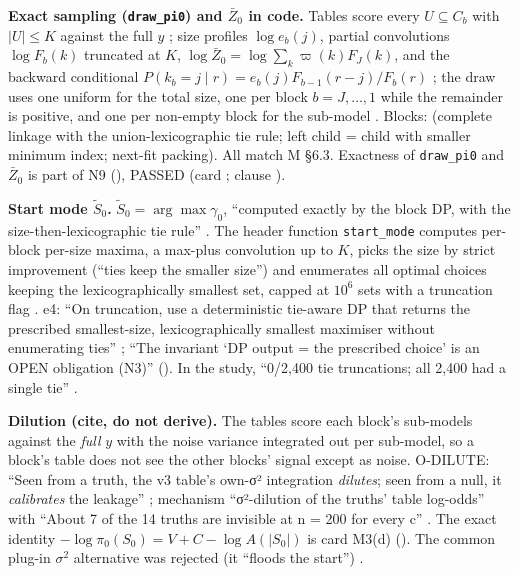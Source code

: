 \textbf{Exact sampling (\texttt{draw\_pi0}) and $\bar Z_0$ in code.} Tables score every $U\subseteq C_b$ with
$|U|\le K$ against the full $y$ ;
size profiles $\log e_b(j)$, partial convolutions $\log F_b(k)$ truncated at $K$, $\log\bar Z_0=\log\sum_k\varpi(k)F_J(k)$, and
the backward conditional $P(k_b=j\mid r)=e_b(j)F_{b-1}(r-j)/F_b(r)$
; the draw uses one uniform for
the total size, one per block $b=J,\dots,1$ while the remainder is positive, and one per non-empty block for the
sub-model . Blocks:
 (complete linkage with the
union-lexicographic tie rule; left child = child with smaller minimum index; next-fit packing). All match M \S6.3.
Exactness of \texttt{draw\_pi0} and $\bar Z_0$ is part of N9 (), PASSED 
(card ; clause ).

\textbf{Start mode $\tilde S_0$.} $\tilde S_0=\arg\max\gamma_0$, ``computed exactly by the block DP, with the size-then-lexicographic
tie rule'' . The header function \texttt{start\_mode} computes
per-block per-size maxima, a max-plus convolution up to $K$, picks the size by strict improvement (``ties keep the smaller
size'') and enumerates all optimal choices keeping the lexicographically smallest set, capped at $10^6$ sets with a
truncation flag . e4: ``On
truncation, use a deterministic tie-aware DP that returns the prescribed smallest-size, lexicographically smallest
maximiser without enumerating ties'' ; ``The invariant `DP output
= the prescribed choice' is an OPEN obligation (N3)'' 
(). In the study, ``0/2,400 tie truncations; all 2,400 had a single tie''
.

\textbf{Dilution (cite, do not derive).} The tables score each block's sub-models against the \emph{full} $y$ with the
noise variance integrated out per sub-model, so a block's table does not see the other blocks' signal except as noise.
O-DILUTE: ``Seen from a truth, the v3 table's own-σ² integration \emph{dilutes}; seen from a null, it \emph{calibrates} the
leakage'' ; mechanism ``σ²-dilution of the truths' table log-odds''
with ``About 7 of the 14 truths are invisible at n = 200 for every c''
. The exact identity $-\log\pi_0(S_0)=V+C-\log A(|S_0|)$ is card M3(d)
 (). The common plug-in $\sigma^2$ alternative was
rejected (it ``floods the start'') .

